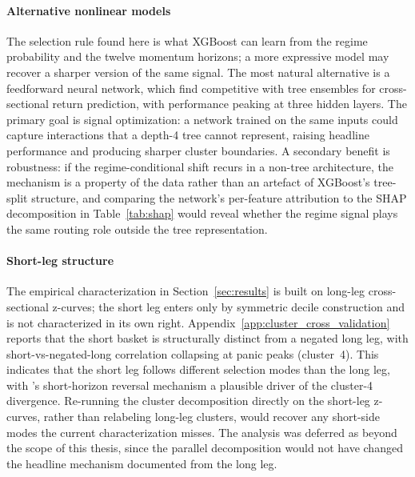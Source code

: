 \bigskip\paragraph{Alternative nonlinear models}
The selection rule found here is what XGBoost can learn from the regime probability and the twelve momentum horizons; a more expressive model may recover a sharper version of the same signal. The most natural alternative is a feedforward neural network, which \citet{Gu2020} find competitive with tree ensembles for cross-sectional return prediction, with performance peaking at three hidden layers. The primary goal is signal optimization: a network trained on the same inputs could capture interactions that a depth-4 tree cannot represent, raising headline performance and producing sharper cluster boundaries. A secondary benefit is robustness: if the regime-conditional shift recurs in a non-tree architecture, the mechanism is a property of the data rather than an artefact of XGBoost's tree-split structure, and comparing the network's per-feature attribution to the SHAP decomposition in Table~\ref{tab:shap} would reveal whether the regime signal plays the same routing role outside the tree representation.

\bigskip\paragraph{Short-leg structure}
The empirical characterization in Section~\ref{sec:results} is built on long-leg cross-sectional z-curves; the short leg enters only by symmetric decile construction and is not characterized in its own right. Appendix~\ref{app:cluster_cross_validation} reports that the short basket is structurally distinct from a negated long leg, with short-vs-negated-long correlation collapsing at panic peaks (cluster~4). This indicates that the short leg follows different selection modes than the long leg, with \citet{Nagel2012}'s short-horizon reversal mechanism a plausible driver of the cluster-4 divergence. Re-running the cluster decomposition directly on the short-leg z-curves, rather than relabeling long-leg clusters, would recover any short-side modes the current characterization misses. The analysis was deferred as beyond the scope of this thesis, since the parallel decomposition would not have changed the headline mechanism documented from the long leg.


